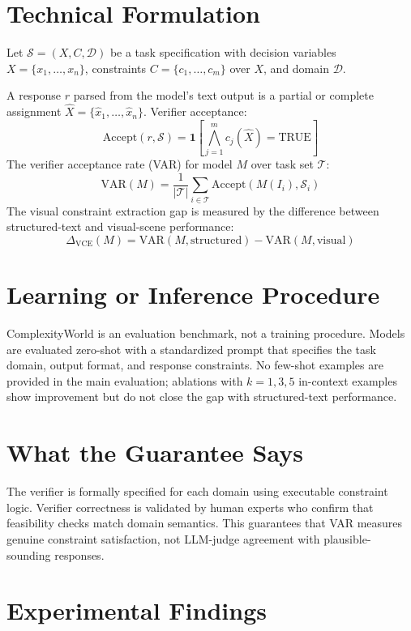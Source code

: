 \documentclass[10pt,twocolumn]{article}
\begin{document}
\section{Technical Formulation}

Let $\mathcal{S} = (X, C, \mathcal{D})$ be a task specification with
decision variables $X = \{x_1, \ldots, x_n\}$, constraints
$C = \{c_1, \ldots, c_m\}$ over $X$, and domain $\mathcal{D}$.

A response $r$ parsed from the model's text output is a partial or
complete assignment $\hat{X} = \{\hat{x}_1, \ldots, \hat{x}_n\}$.
Verifier acceptance:
\[
  \text{Accept}(r, \mathcal{S}) = \mathbf{1}\!\left[
    \bigwedge_{j=1}^m c_j(\hat{X}) = \text{TRUE}\right]
\]
The verifier acceptance rate (VAR) for model $M$ over task set $\mathcal{T}$:
\[
  \text{VAR}(M) = \frac{1}{|\mathcal{T}|}\sum_{i \in \mathcal{T}}
    \text{Accept}(M(I_i), \mathcal{S}_i)
\]
The visual constraint extraction gap is measured by the difference
between structured-text and visual-scene performance:
\[
  \Delta_\text{VCE}(M) = \text{VAR}(M, \text{structured})
    - \text{VAR}(M, \text{visual})
\]

\section{Learning or Inference Procedure}

ComplexityWorld is an evaluation benchmark, not a training procedure.
Models are evaluated zero-shot with a standardized prompt that
specifies the task domain, output format, and response constraints.
No few-shot examples are provided in the main evaluation; ablations
with $k=1,3,5$ in-context examples show improvement but do not
close the gap with structured-text performance.

\section{What the Guarantee Says}

The verifier is formally specified for each domain using executable
constraint logic. Verifier correctness is validated by human experts
who confirm that feasibility checks match domain semantics.
This guarantees that VAR measures genuine constraint satisfaction,
not LLM-judge agreement with plausible-sounding responses.

\section{Experimental Findings}
\end{document}
